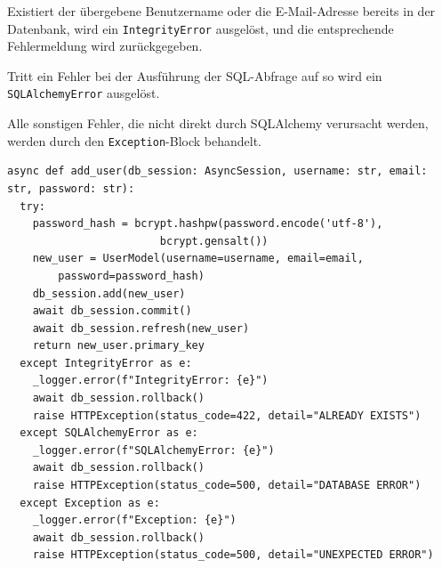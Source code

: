 \documentclass[12pt, letterpaper]{article}
\begin{document}
  \par Existiert der übergebene Benutzername oder die E-Mail-Adresse bereits in der Datenbank, wird ein \texttt{IntegrityError} ausgelöst, und die entsprechende Fehlermeldung wird zurückgegeben.
  \par Tritt ein Fehler bei der Ausführung der SQL-Abfrage auf so wird ein \texttt{SQLAlchemyError} ausgelöst.
  \par Alle sonstigen Fehler, die nicht direkt durch SQLAlchemy verursacht werden, werden durch den \texttt{Exception}-Block behandelt.
  \begin{lstlisting}[style=mypython, label={lst:adduser}, caption={queries.py: add\_user}]
async def add_user(db_session: AsyncSession, username: str, email: str, password: str):
  try:
    password_hash = bcrypt.hashpw(password.encode('utf-8'), 
                        bcrypt.gensalt())
    new_user = UserModel(username=username, email=email, 
        password=password_hash)
    db_session.add(new_user)
    await db_session.commit()
    await db_session.refresh(new_user)
    return new_user.primary_key
  except IntegrityError as e:
    _logger.error(f"IntegrityError: {e}")
    await db_session.rollback()
    raise HTTPException(status_code=422, detail="ALREADY EXISTS")
  except SQLAlchemyError as e:
    _logger.error(f"SQLAlchemyError: {e}")
    await db_session.rollback()
    raise HTTPException(status_code=500, detail="DATABASE ERROR")
  except Exception as e:
    _logger.error(f"Exception: {e}")
    await db_session.rollback()
    raise HTTPException(status_code=500, detail="UNEXPECTED ERROR")
  \end{lstlisting}
% 
\end{document}
